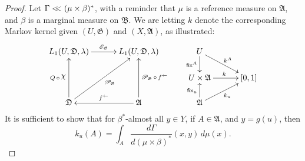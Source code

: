 \documentclass[
twoside=true,
paper=letter,
fontsize=9pt,
pagesize=auto,
leqno,
openany,
headsepline,
overfullrule,
]{scrbook}
\theoremstyle{plain}
\theoremstyle{plain}
\theoremstyle{definition}
\theoremstyle{bfnoteitalic}
\theoremstyle{bfnoteroman}
\newcommand{\sigalg}[1]{\mathfrak{#1}}
\newcommand{\cali}[1]{\mathscr{#1}}
\newcommand{\sfop}[1]{\mathsf{#1}}
\newcommand{\condexpop}[1]{\mathop{\cali{E}\hspace{-1pt}}\nolimits_{#1}}
\newcommand{\condprobop}[1]{\mathop{\cali{P}\hspace{-1pt}}\nolimits_{#1}}
\newcommand{\charfunction}[1]{\mathop{{\raisebox{2pt}{$\chi$}}_{#1}}}
\newcommand{\preimage}[1]{\mathop{#1^{\leftarrow}}}
\newcommand{\sigmaalgebra}{\sigalg{A}}
\newcommand{\sigmaalgebraii}{\sigalg{B}}
\newcommand{\funcg}{g}
\newcommand{\funck}{k}
\newcommand{\function}{f}
\newcommand{\measurespace}{X}
\newcommand{\measurespaceii}{Y}
\newcommand{\mspaceelt}{x}
\newcommand{\mspaceeltii}{y}
\newcommand{\abscont}{\mathrel{< \kern-3.5pt <}}
\newcommand{\measure}{\mu}
\newcommand{\measmu}{\mu}
\newcommand{\measureiii}{\lambda}
\newcommand{\seti}{A}
\newcommand{\fixinthefirst}[1]{\sfop{fix}_{#1}}
\newcommand{\fixinthesecond}[1]{\sfop{fix}^{#1}}
\newcommand{\uspace}{U}%
\newcommand{\uspaceelt}{u}
\newcommand{\uspacesig}{\sigalg{D}}
\newcommand{\measonprod}{\Gamma}%
\newcommand{\marginaltwo}{\beta}%
\begin{document}
\begin{proof}
Let
$\measonprod\abscont (\measmu\times\marginaltwo)^*$, with a reminder that $\measmu$ is a reference measure on $\sigmaalgebra$, and $\marginaltwo$ is a marginal measure on
$\sigmaalgebraii$.
We are letting
$\funck$
denote the corresponding Markov kernel given
$(\uspace,\sigalg{G})$ and $(\measurespace,\sigmaalgebra)$, as illustrated:
\[
\xymatrix@R=16pt@C=30pt{
L_1(\uspace, \uspacesig, \measureiii) \ar[r]^{\condexpop{\sigalg{G}}}
& L_1(\uspace, \uspacesig, \measureiii)
& \uspace
\ar[d]_-{\fixinthesecond{\seti}}
\ar[dr]^{\funck^\seti}
\\
&
& \uspace\times\sigmaalgebra \ar[r]^{\funck}
& [0,1]
\\
\uspacesig
\ar[uu]^{Q\,\circ\,\charfunction{}}
\ar[uur]_{\condprobop{\sigalg{G}}}
& \sigmaalgebra
\ar[uu]_{\condprobop{\sigalg{G}}\circ \preimage{\function}}
\ar[l]_{\preimage{\function}}
& \sigmaalgebra
\ar[u]^{\fixinthefirst{\uspaceelt}}
\ar[ur]_{\funck_\uspaceelt}
&
\\
}
\]
It is sufficient to show that
for $\marginaltwo^*$\hyp{}almost all $\mspaceeltii\in\measurespaceii$,
if $\seti\in\sigmaalgebra$, and
$\mspaceeltii = \funcg(\uspaceelt)$,
then
\[
\funck_\uspaceelt(\seti)
=
\int_\seti
\frac{d\measonprod}{d(\measure\times\marginaltwo)^*}
( \mspaceelt, \mspaceeltii )
\,d\measmu(\mspaceelt).
\]


\end{proof}
\end{document}
